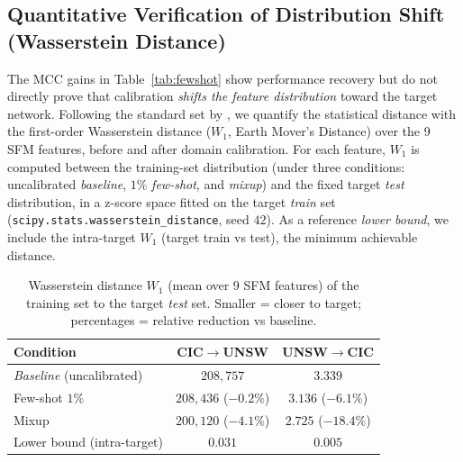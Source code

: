 \documentclass[preprint,12pt,authoryear]{elsarticle}
\begin{document}
\subsection{Quantitative Verification of Distribution Shift (Wasserstein Distance)}
\label{sec:wass}

The MCC gains in Table~\ref{tab:fewshot} show performance recovery but do not
directly prove that calibration \emph{shifts the feature distribution} toward the
target network. Following the standard set by \citet{layeghy}, we quantify the
statistical distance with the first-order Wasserstein distance ($W_1$, Earth
Mover's Distance) \citep{wasserstein} over the 9 SFM features, before and after
domain calibration. For each feature, $W_1$ is computed between the training-set
distribution (under three conditions: uncalibrated \emph{baseline}, $1\%$
\emph{few-shot}, and \emph{mixup}) and the fixed target \emph{test} distribution,
in a z-score space fitted on the target \emph{train} set
(\texttt{scipy.stats.wasserstein\_distance}, seed $42$). As a reference
\emph{lower bound}, we include the intra-target $W_1$ (target train vs test), the
minimum achievable distance.

\begin{table}[h]
\centering
\caption{Wasserstein distance $W_1$ (mean over 9 SFM features) of the training set
to the target \emph{test} set. Smaller = closer to target; percentages = relative
reduction vs baseline.}
\label{tab:wass}
\begin{tabular}{lcc}
\toprule
Condition & CIC$\rightarrow$UNSW & UNSW$\rightarrow$CIC \\
\midrule
\emph{Baseline} (uncalibrated) & $208{,}757$ & $3.339$ \\
Few-shot $1\%$        & $208{,}436$ ($-0.2\%$) & $3.136$ ($-6.1\%$) \\
Mixup                 & $200{,}120$ ($-4.1\%$) & $2.725$ ($-18.4\%$) \\
\midrule
Lower bound (intra-target) & $0.031$ & $0.005$ \\
\bottomrule
\end{tabular}
\end{table}
\end{document}
